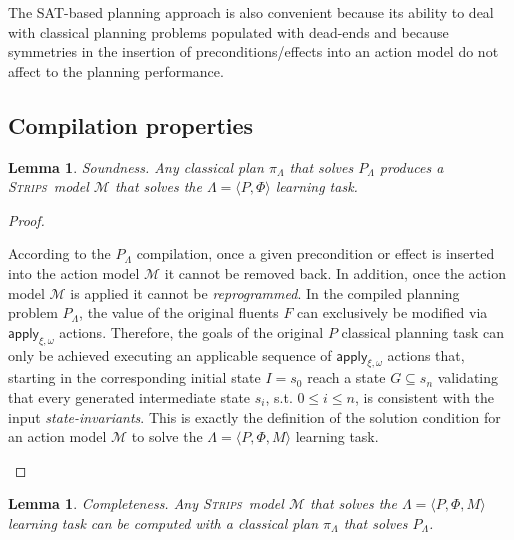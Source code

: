 \documentclass{article}
\newcommand{\tup}[1]{{\langle #1 \rangle}}
\newcommand{\strips}{\textsc{Strips}}
\newtheorem{mylemma}[mytheorem]{Lemma}
\begin{document}
The SAT-based planning approach is also convenient because its ability to deal with classical planning problems populated with dead-ends and because symmetries in the insertion of preconditions/effects into an action model do not affect to the planning performance. 


\subsection{Compilation properties}
\begin{mylemma}
Soundness. Any classical plan $\pi_{\Lambda}$ that solves $P_{\Lambda}$ produces a \strips\ model $\mathcal{M}$ that solves the $\Lambda=\tup{P,\Phi}$ learning task.
\end{mylemma}

\begin{proof}[Proof]
\begin{small}
According to the $P_{\Lambda}$ compilation, once a given precondition or effect is inserted into the action model $\mathcal{M}$ it cannot be removed back. In addition, once the action model $\mathcal{M}$ is applied it cannot be {\em reprogrammed}. In the compiled planning problem $P_{\Lambda}$, the value of the original fluents $F$ can exclusively be modified via $\mathsf{apply_{\xi,\omega}}$ actions.  Therefore, the goals of the original $P$ classical planning task can only be achieved executing an applicable sequence of $\mathsf{apply_{\xi,\omega}}$ actions that, starting in the corresponding initial state $I=s_0$ reach a state $G \subseteq s_n$ validating that every generated intermediate state $s_i$, s.t. $0\leq i\leq n$, is consistent with the input {\em state-invariants}. This is exactly the definition of the solution condition for an action model $\mathcal{M}$ to solve the $\Lambda=\tup{P,\Phi,M}$ learning task. 
\end{small}
\end{proof}

\begin{mylemma}
Completeness. Any \strips\ model $\mathcal{M}$ that solves the $\Lambda=\tup{P,\Phi,M}$ learning task can be computed with a classical plan $\pi_{\Lambda}$ that solves $P_{\Lambda}$.
\end{mylemma}
\end{document}
